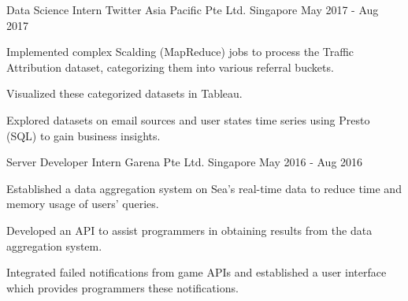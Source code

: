 

\begin{cventries}

	\cventry
	{Data Science Intern} %
	{Twitter Asia Pacific Pte Ltd.} %
	{Singapore} %
	{May 2017 - Aug 2017} %
	{
		\begin{cvitems} %
		\item {Implemented complex Scalding (MapReduce) jobs to process the Traffic Attribution dataset, categorizing them into various referral buckets.}
		\item {Visualized these categorized datasets in Tableau.}
		\item {Explored datasets on email sources and user states time series using Presto (SQL) to gain business insights.}
		\end{cvitems}
	}

	\cventry
	{Server Developer Intern} %
	{Garena Pte Ltd.} %
	{Singapore} %
	{May 2016 - Aug 2016} %
	{
		\begin{cvitems} %
		\item {Established a data aggregation system on Sea's real-time data to reduce time and memory usage of users' queries.}
		\item {Developed an API to assist programmers in obtaining results from the data aggregation system.}
		\item {Integrated failed notifications from game APIs and established a user interface which provides programmers these notifications.}
		\end{cvitems}
	}

\end{cventries}
